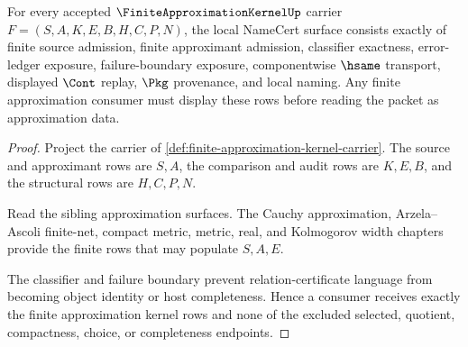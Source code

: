 \begin{theorem}
\label{thm:finite-approximation-kernel-namecert-obligations}
For every accepted $\FiniteApproximationKernelUp$ carrier $F=(S,A,K,E,B,H,C,P,N)$, the local NameCert surface consists exactly of finite source admission, finite approximant admission, classifier exactness, error-ledger exposure, failure-boundary exposure, componentwise $\hsame$ transport, displayed $\Cont$ replay, $\Pkg$ provenance, and local naming. Any finite approximation consumer must display these rows before reading the packet as approximation data.
\end{theorem}
\begin{proof}
Project the carrier of \autoref{def:finite-approximation-kernel-carrier}. The source and approximant rows are $S,A$, the comparison and audit rows are $K,E,B$, and the structural rows are $H,C,P,N$.

Read the sibling approximation surfaces. The Cauchy approximation, Arzela--Ascoli finite-net, compact metric, metric, real, and Kolmogorov width chapters provide the finite rows that may populate $S,A,E$.

The classifier and failure boundary prevent relation-certificate language from becoming object identity or host completeness. Hence a consumer receives exactly the finite approximation kernel rows and none of the excluded selected, quotient, compactness, choice, or completeness endpoints.
\end{proof}

\begin{closurestatus}{\FiniteApproximationKernelUp}
  \theoryclosure{\seedClosure}
  \formalstatus{\unformalizedV}
\end{closurestatus}
